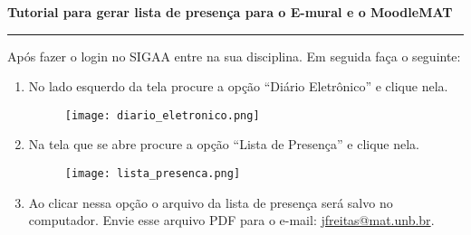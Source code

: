 \documentclass[12pt]{report}
\makeatletter
\def\email{jfreitas@mat.unb.br}
\makeatother
\begin{document}
\begin{center}
{\Large \textbf{Tutorial para gerar lista de presença para o E-mural e o MoodleMAT}}
\end{center}
\vspace{.3cm}
\hrule

\vspace{.7cm}

Após fazer o login no SIGAA entre na sua disciplina. Em seguida faça o seguinte:

\begin{enumerate}[\bf 1)]
    \item No lado esquerdo da tela procure a opção ``Diário Eletrônico'' e clique nela.
	\begin{figure}[H]
    	\centering
    	\hspace*{-2.5cm}\texttt{[image: diario\_eletronico.png]}
  	\end{figure}

	\newpage

        \item Na tela que se abre procure a opção ``Lista de Presença'' e clique nela.
	\begin{figure}[H]
	   \centering
        	\hspace*{-2.5cm}\texttt{[image: lista\_presenca.png]}
	    \end{figure}

	\item Ao clicar nessa opção o arquivo da lista de presença será salvo no computador. Envie esse arquivo PDF para o e-mail: \href{mailto:{\email}}{\email}.
    \end{enumerate}
\end{document}

